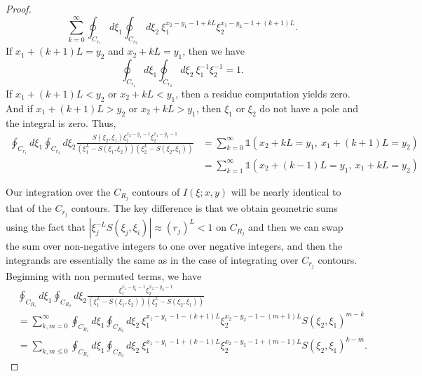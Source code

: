 \documentclass[a4paper,11pt]{article}
\theoremstyle{definition}
\begin{document}
\begin{proof}
\begin{equation}
    \sum_{k=0}^\infty\oint_{C_{r_1}}d\xi_1\oint_{C_{r_2}}d\xi_2\ \xi_1^{x_2-y_1-1+kL}\xi_2^{x_1-y_2-1+(k+1)L}.
\end{equation}
If $x_1 + (k+1)L=y_2$ and $x_2+kL=y_1$, then we have 
\begin{equation}
    \oint_{C_{r_1}}d\xi_1\oint_{C_{r_2}}d\xi_2 \ \xi_1^{-1}\xi_2^{-1} = 1.
\end{equation}
If $x_1 + (k+1)L<y_2$ or $x_2+kL<y_1$, then a residue computation yields zero. And if $x_1 + (k+1)L>y_2$ or $x_2+kL>y_1$, then $\xi_1$ or $\xi_2$ do not have a pole and the integral is zero. Thus, 
\begin{equation}
\begin{split}
    \oint_{C_{r_1}}d\xi_1\oint_{C_{r_2}}d\xi_2 \frac{S(\xi_2,\xi_1)\xi_1^{x_2-y_1-1}\xi_2^{x_1-y_2-1}}{\left(\xi_1^L - S(\xi_1,\xi_2) \right)\left(\xi_2^L - S(\xi_2,\xi_1) \right)}&=\sum_{k=0}^\infty\mathds{1}\left(x_2+kL=y_1,\ x_1+(k+1)L=y_2 \right)\\
    &=\sum_{k=1}^\infty\mathds{1}\left(x_2+(k-1)L=y_1,\ x_1+kL=y_2 \right)
    \end{split}
\end{equation}

Our integration over the $C_{R_j}$ contours of $I(\xi;x,y)$ will be nearly identical to that of the $C_{r_j}$ contours. The key difference is that we obtain geometric sums using the fact that $|\xi_j^{-L} S(\xi_j,\xi_i)|\approx (r_j)^L <1$ on $C_{R_j}$ and then we can swap the sum over non-negative integers to one over negative integers, and then the integrands are essentially the same as in the case of integrating over $C_{r_j}$ contours. Beginning with non permuted terms, we have
\begin{equation}
    \begin{split}
        &\oint_{C_{R_1}}d\xi_1\oint_{C_{R_2}}d\xi_2 \frac{\xi_1^{x_1-y_1-1}\xi_2^{x_2-y_2-1}}{\left(\xi_1^L - S(\xi_1,\xi_2) \right)\left(\xi_2^L - S(\xi_2,\xi_1) \right)} \\ 
        &=\sum_{k,m=0}^\infty \oint_{C_{R_1}}d\xi_1\oint_{C_{R_2}}d\xi_2 \ \xi_1^{x_1-y_1-1-(k+1)L}\xi_2^{x_2-y_2-1-(m+1)L}S(\xi_2,\xi_1)^{m-k} \\ 
        &= \sum_{k,m\leq0} \oint_{C_{R_1}}d\xi_1\oint_{C_{R_2}}d\xi_2 \ \xi_1^{x_1-y_1-1+(k-1)L}\xi_2^{x_2-y_2-1+(m-1)L}S(\xi_2,\xi_1)^{k-m}.
    \end{split}
\end{equation}


\end{proof}
\end{document}
